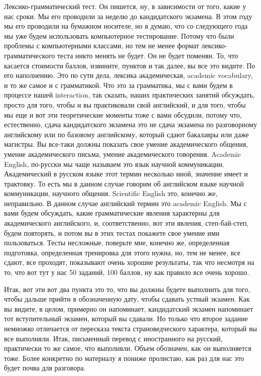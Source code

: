 \documentclass[main.tex]{subfiles}
\begin{document}
Лексико-грамматический тест.
Он пишется, ну, в зависимости от того, какие у нас сроки.
Мы его проводили за неделю до кандидатского экзамена.
В этом году мы его проводили на бумажном носителе, но я думаю, что со следующего года мы уже будем использовать компьютерное тестирование.
Потому что были проблемы с компьютерными классами, но тем не менее формат лексико-грамматического теста никто менять не будет.
Он не будет поменян.
То, что касается стоимости баллов, извините, пунктов и так далее, вы все это видите.
По его наполнению.
Это по сути дела, лексика академическая, academic vocabulary, и то же самое и с грамматикой.
Что это за грамматика, мы с вами будем в процессе нашей interaction, так сказать, наших практических занятий обсуждать, просто для того, чтобы и вы практиковали свой английский, и для того, чтобы мы еще и вот эти теоретические моменты тоже с вами обсудили, потому что, естественно, сдача кандидатского экзамена это не сдача экзамена по разговорному английскому или по базовому английскому, который сдают бакалавры или даже магистры.
Вы все-таки должны показать свое умение академического общения, умение академического письма, умение академического говорения.
Academic English, по-русски мы чаще называем это язык научной коммуникации.
Академический в русском языке этот термин несколько иной, значение имеет и трактовку.
То есть мы в данном случае говорим об английском языке научной коммуникации, научного общения.
Scientific English это, конечно же, неправильно.
В данном случае английский термин это academic English.
Мы с вами будем обсуждать, какие грамматические явления характерны для академического английского, и, соответственно, вот эти явления, степ-бай-степ, будем повторять, и потом вы в этих тестах покажете свое умение ими пользоваться.
Тесты несложные, поверьте мне, конечно же, определенная подготовка, определенная тренировка для этого нужна, но, тем не менее, все сдают, все проходят, показывают очень хорошие результаты, так что несмотря на то, что вот тут у нас 50 заданий, 100 баллов, ну как правило все очень хорошо.

Итак, вот эти вот два пункта это то, что вы должны будете выполнить для того, чтобы дальше прийти в обозначенную дату, чтобы сдавать устный экзамен.
Как вы видите, в целом, примерно он напоминает, кандидатский экзамен напоминает тот вступительный экзамен, который вы сдавали.
Но только что второе задание немножко отличается от пересказа текста страноведческого характера, который вы все выполняли.
Итак, письменный перевод с иностранного на русский, практически то же самое, что выполняли.
Объем обозначен, как он выполняется тоже.
Более конкретно по материалу я пониже пролистаю, как раз для нас это будет почва для разговора.
\end{document}
